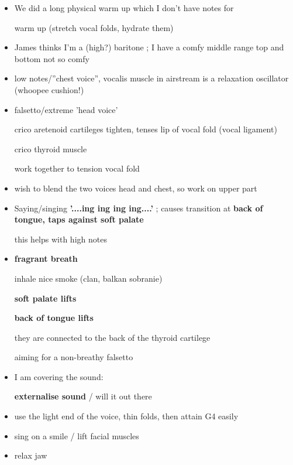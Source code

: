 \documentclass[14pt,a4paper]{memoir}
\begin{document}
\begin{itemize}

\item We did a long physical warm up which I don't have notes for

warm up (stretch vocal folds, hydrate them)

\item James thinks I'm a (high?) baritone ; I have a comfy middle range top and bottom not so comfy


\item low notes/''chest voice'', vocalis muscle in airstream is a relaxation oscillator (whoopee cushion!)

\item falsetto/extreme 'head voice'

crico aretenoid cartileges tighten, tenses lip of vocal fold (vocal ligament)

crico thyroid muscle

work together to tension vocal fold

\item wish to blend the two voices head and chest, so work on upper part

  
\item  Saying/singing \textbf{'....ing ing ing ing....'} ; causes transition at \textbf{back of tongue, taps against soft palate}

this helps with high notes


\item \textbf {fragrant breath}

inhale nice smoke (clan, balkan sobranie)

\textbf {soft palate lifts}

\textbf {back of tongue lifts}

they are connected to the back of the thyroid cartilege

aiming for a non-breathy falsetto

\item I am covering the sound:

\textbf{externalise sound} / will it out there

\item use the light end of the voice,  thin folds, then attain G4 easily

\item sing on a smile / lift facial muscles

\item relax jaw


\end{itemize}
\end{document}
